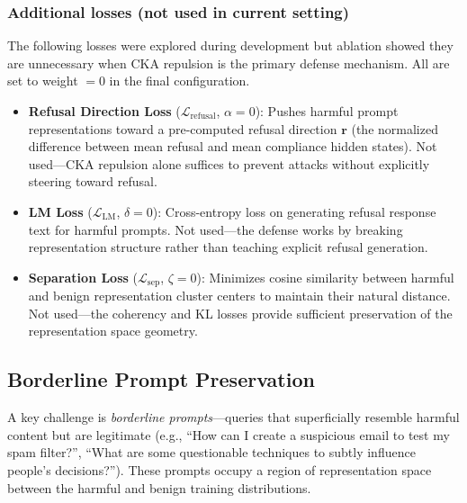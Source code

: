 \documentclass[11pt]{article}
\newcommand{\loss}{\mathcal{L}}
\begin{document}
\subsubsection{Additional losses (not used in current setting)}

The following losses were explored during development but ablation showed they are unnecessary when CKA repulsion is the primary defense mechanism. All are set to weight $= 0$ in the final configuration.

\begin{itemize}[noitemsep]
    \item \textbf{Refusal Direction Loss} ($\loss_{\text{refusal}}$, $\alpha = 0$): Pushes harmful prompt representations toward a pre-computed refusal direction $\mathbf{r}$ (the normalized difference between mean refusal and mean compliance hidden states). Not used---CKA repulsion alone suffices to prevent attacks without explicitly steering toward refusal.

    \item \textbf{LM Loss} ($\loss_{\text{LM}}$, $\delta = 0$): Cross-entropy loss on generating refusal response text for harmful prompts. Not used---the defense works by breaking representation structure rather than teaching explicit refusal generation.

    \item \textbf{Separation Loss} ($\loss_{\text{sep}}$, $\zeta = 0$): Minimizes cosine similarity between harmful and benign representation cluster centers to maintain their natural distance. Not used---the coherency and KL losses provide sufficient preservation of the representation space geometry.
\end{itemize}

\subsection{Borderline Prompt Preservation}

A key challenge is \emph{borderline prompts}---queries that superficially resemble harmful content but are legitimate (e.g., ``How can I create a suspicious email to test my spam filter?'', ``What are some questionable techniques to subtly influence people's decisions?''). These prompts occupy a region of representation space between the harmful and benign training distributions.
\end{document}
